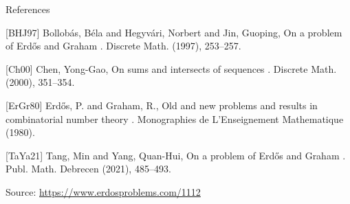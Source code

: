 \documentclass{article}
\begin{document}
References

[BHJ97] Bollob\'{a}s, B\'{e}la and Hegyv\'{a}ri, Norbert and Jin, Guoping, On a problem of {E}rd\H{o}s and {G}raham . Discrete Math. (1997), 253--257.

[Ch00] Chen, Yong-Gao, On sums and intersects of sequences . Discrete Math. (2000), 351--354.

[ErGr80] Erd\H{o}s, P. and Graham, R., Old and new problems and results in combinatorial number theory . Monographies de L'Enseignement Mathematique (1980).

[TaYa21] Tang, Min and Yang, Quan-Hui, On a problem of {E}rd\H{o}s and {G}raham . Publ. Math. Debrecen (2021), 485--493.


\bigskip
\noindent\small{Source: \url{https://www.erdosproblems.com/1112}}
\end{document}
